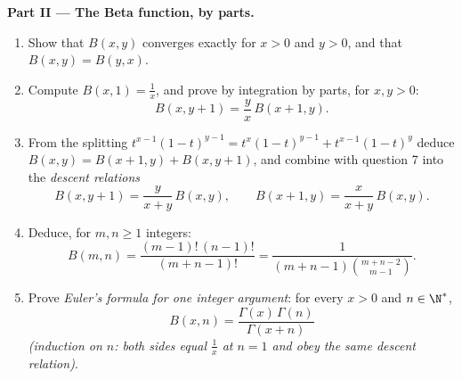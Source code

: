 \begin{problem}
\medskip
\noindent\textbf{Part II --- The Beta function, by parts.}
\begin{enumerate}[resume]
  \item Show that $B(x,y)$ converges exactly for $x > 0$ and $y >
        0$, and that $B(x,y) = B(y,x)$.
  \item Compute $B(x, 1) = \frac1x$, and prove by integration by
        parts, for $x, y > 0$:
        \[
        B(x, y+1) = \frac{y}{x}\,B(x+1, y) .
        \]
  \item From the splitting $t^{x-1}(1-t)^{y-1} =
        t^{x}(1-t)^{y-1} + t^{x-1}(1-t)^{y}$ deduce $B(x,y) =
        B(x+1,y) + B(x,y+1)$, and combine with question 7 into
        the \emph{descent relations}
        \[
        B(x, y+1) = \frac{y}{x+y}\,B(x,y),
        \qquad
        B(x+1, y) = \frac{x}{x+y}\,B(x,y) .
        \]
  \item Deduce, for $m, n \geq 1$ integers:
        \[
        B(m, n) = \frac{(m-1)!\,(n-1)!}{(m+n-1)!}
        = \frac{1}{(m+n-1)\binom{m+n-2}{m-1}} .
        \]
  \item Prove \emph{Euler's formula for one integer argument}:
        for every $x > 0$ and $n \in \N^*$,
        \[
        B(x, n) = \frac{\Gamma(x)\,\Gamma(n)}{\Gamma(x + n)}
        \]
        \emph{(induction on $n$: both sides equal $\frac1x$ at $n
        = 1$ and obey the same descent relation)}.
\end{enumerate}


\end{problem}
